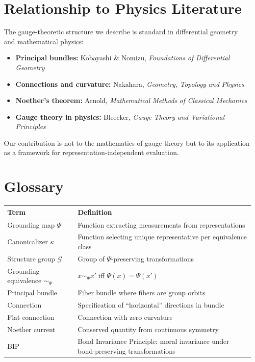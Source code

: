 \documentclass[12pt]{article}
\theoremstyle{definition}
\theoremstyle{remark}
\newcommand{\calG}{\mathcal{G}}
\begin{document}
\section{Relationship to Physics Literature}\label{app:physics}

The gauge-theoretic structure we describe is standard in differential geometry and mathematical
physics:

\begin{itemize}
    \item \textbf{Principal bundles:} Kobayashi \& Nomizu, \emph{Foundations of Differential Geometry}
    \item \textbf{Connections and curvature:} Nakahara, \emph{Geometry, Topology and Physics}
    \item \textbf{Noether's theorem:} Arnold, \emph{Mathematical Methods of Classical Mechanics}
    \item \textbf{Gauge theory in physics:} Bleecker, \emph{Gauge Theory and Variational Principles}
\end{itemize}

Our contribution is not to the mathematics of gauge theory but to its application as a
framework for representation-independent evaluation.

\section{Glossary}\label{app:glossary}

\begin{table}[h]
\centering
\begin{tabularx}{\textwidth}{lX}
\toprule
\textbf{Term} & \textbf{Definition} \\
\midrule
Grounding map $\Psi$ & Function extracting measurements from representations \\
Canonicalizer $\kappa$ & Function selecting unique representative per equivalence class \\
Structure group $\calG$ & Group of $\Psi$-preserving transformations \\
Grounding equivalence $\sim_\Psi$ & $x \sim_\Psi x'$ iff $\Psi(x) = \Psi(x')$ \\
Principal bundle & Fiber bundle where fibers are group orbits \\
Connection & Specification of ``horizontal'' directions in bundle \\
Flat connection & Connection with zero curvature \\
Noether current & Conserved quantity from continuous symmetry \\
BIP & Bond Invariance Principle: moral invariance under bond-preserving transformations \\
\bottomrule
\end{tabularx}
\end{table}
\end{document}
